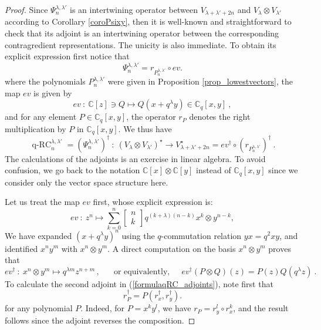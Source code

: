 \documentclass[a4paper,12pt]{article}
\numberwithin{equation}{section}
\newcommand{\C}{\mathbb{C}}
\newcommand{\qbinom}[2]{\begin{bmatrix}#1\\#2\end{bmatrix}}
\theoremstyle{rem}
\theoremstyle{definition}
\begin{document}
\begin{proof}
Since $\Psi_n^{\lambda,\lambda'}$ is an intertwining operator between $V_{\lambda+\lambda'+2n}$ and $V_\lambda\otimes V_{\lambda'}$ according to Corollary \ref{coroPsixy}, then it is well-known and straightforward to check that its adjoint is an intertwining operator between the corresponding contragredient representations. The unicity is also immediate. To obtain its explicit expression first notice that 
\begin{equation}
\Psi_n^{\lambda,\lambda'}=r_{P_n^{\lambda,\lambda'}}\circ ev.
\end{equation}
where the polynomials $P_n^{\lambda,\lambda'}$ were given in Proposition \ref{prop_lowestvectors}, the map $ev $ is given by
\[ev \ :\ \C[z]\ni Q \mapsto Q(x+q^\lambda y)\in \C_q[x,y]\ ,\]
and for any element $P\in \C_q[x,y]$, the operator $r_P$ denotes the right multiplication by $P$ in $\C_q[x,y]$. We thus have
\begin{equation}\label{formulaqRC_adjoints} \operatorname{q-RC}^{\lambda,\lambda'}_n=\left(\Psi_n^{\lambda,\lambda'}\right)^\dagger\ :\ (V_\lambda\otimes V_{\lambda'})^\star\to V_{\lambda+\lambda'+2n}^{\star}=ev^{\dagger}\circ (r_{P_n^{\lambda,\lambda'}})^\dagger\ .\end{equation}
The calculations of the adjoints is an exercise in linear algebra. To avoid confusion, we go back to the notation $\C[x]\otimes \C[y]$ instead of $\C_q[x,y]$ since we consider only the vector space structure here. 

Let us treat the map $ev$ first, whose explicit expression is:
\[
ev\ :\ z^n\mapsto \sum_{k=0}^n \qbinom{n}{k}q^{(k+\lambda)(n-k)}x^k\otimes y^{n-k},
\]
We have expanded $(x+q^{\lambda}y)^n$ using the $q$-commutation relation $yx=q^2xy$, and identified $x^ny^m$ with $x^n\otimes y^m$. A direct computation on the basis $x^n\otimes y^m $ proves that
\begin{equation}\label{evdagger}
ev^\dagger \ :\ x^n\otimes y^m\mapsto  q^{\lambda m}z^{n+m}\,,\ \ \ \quad \text{or equivalently,}\quad \ \  ev^\dagger (P\otimes Q) (z)= P(z)Q(q^\lambda z)\ .\end{equation}
To calculate the second adjoint in (\ref{formulaqRC_adjoints}), note first that
\[
r_{P}^\dagger = P(r_x^\dagger,r_y^\dagger).
\]
for any polynomial $P$. Indeed, for $P=x^ky^l$, we have $r_P=r_y^l\circ r_x^k$, and the result follows since the adjoint reverses the composition. 


\end{proof}
\end{document}

